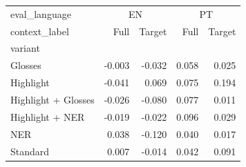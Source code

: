 \begin{tabular}{lrrrr}
\toprule
eval\_language & \multicolumn{2}{c}{EN} & \multicolumn{2}{c}{PT} \\
context\_label & Full & Target & Full & Target \\
variant &  &  &  &  \\
\midrule
Glosses & -0.003 & -0.032 & 0.058 & 0.025 \\
Highlight & -0.041 & 0.069 & 0.075 & 0.194 \\
Highlight + Glosses & -0.026 & -0.080 & 0.077 & 0.011 \\
Highlight + NER & -0.019 & -0.022 & 0.096 & 0.029 \\
NER & 0.038 & -0.120 & 0.040 & 0.017 \\
Standard & 0.007 & -0.014 & 0.042 & 0.091 \\
\bottomrule
\end{tabular}
